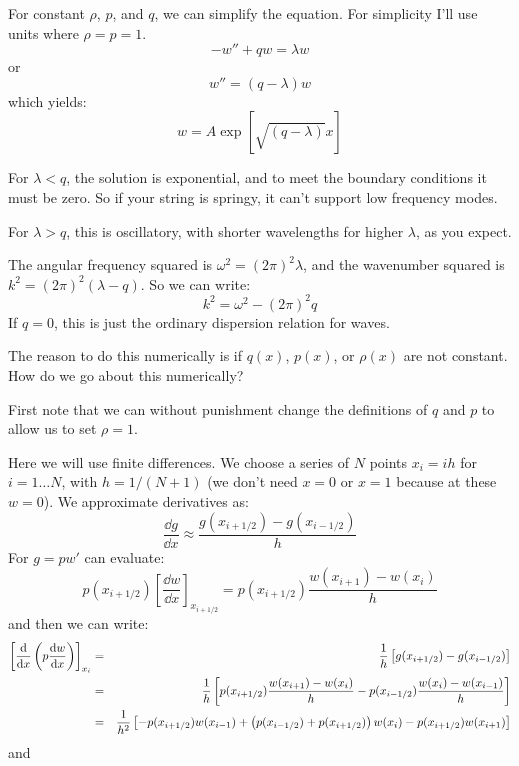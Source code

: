 For constant $\rho$, $p$, and $q$, we can simplify the equation. For
simplicity I'll use units where $\rho = p =1$.
\begin{equation}
- w'' + q w = \lambda w
\end{equation}
or 
\begin{equation}
w'' = (q - \lambda) w
\end{equation}
which yields:
\begin{equation}
w = A \exp\left[\sqrt{(q-\lambda)} x\right]
\end{equation}


\begin{answer}
For $\lambda < q$, the solution is exponential, and to meet the
boundary conditions it must be zero. So if your string is springy, it
can't support low frequency modes.

For $\lambda > q$, this is oscillatory, with shorter wavelengths for
higher $\lambda$, as you expect.
\end{answer}


\begin{answer}
The angular frequency squared is $\omega^2 = (2\pi)^2 \lambda$, and the
wavenumber squared is $k^2 = (2\pi)^2 (\lambda - q)$. So we can write:
\begin{equation}
k^2 = \omega^2 - (2\pi)^2 q
\end{equation}
If $q=0$, this is just the ordinary dispersion relation for waves.
\end{answer}

The reason to do this numerically is if $q(x)$, $p(x)$, or $\rho(x)$
are not constant. How do we go about this numerically?

First note that we can without punishment change the definitions of
$q$ and $p$ to allow us to set $\rho=1$. 

Here we will use finite differences. We choose a series of $N$ points
$x_i = i h $ for $i=1\ldots N$, with $h=1/(N+1)$ (we don't need $x=0$
or $x=1$ because at these $w=0$). We approximate derivatives as:
\begin{equation}
\frac{\dd{g}}{\dd{x}} \approx \frac{g(x_{i+1/2}) - g(x_{i-1/2})}{h}
\end{equation}
For $g=p w'$ can evaluate:
\begin{equation}
p(x_{i+1/2})\left[\frac{\dd{w}}{\dd{x}}\right]_{x_{i+1/2}} =
p(x_{i+1/2}) \frac{w(x_{i+1}) - w(x_i)}{h}
\end{equation}
and then we can write:
\begin{eqnarray}
  \left[\frac{{\rm d}}{{\rm d}x}\left(p\frac{{\rm d}w}{{\rm d}x}\right)\right]_{x_i}
  &=& \frac{1}{h}\left[g(x_{i+1/2}) - g(x_{i-1/2})\right] \cr
  &=& \frac{1}{h}\left[p(x_{i+1/2}) \frac{w(x_{i+1}) - w(x_i)}{h}
    - p(x_{i-1/2}) \frac{w(x_{i}) - w(x_{i-1})}{h}\right] \cr
  &=& \frac{1}{h^2}\left[ - p(x_{i+1/2}) w(x_{i-1})
    + \left(p(x_{i-1/2}) + p(x_{i+1/2})\right) w(x_i)
    - p(x_{i+1/2}) w(x_{i+1})\right]
\end{eqnarray}
and 

